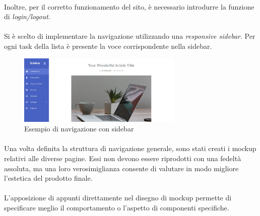 \documentclass[12pt,a4paper,twoside,english,italian]{book}
\begin{document}
\paragraph{} Inoltre, per il corretto funzionamento del sito, è necessario introdurre la funzione di \emph{login/logout}.

\paragraph{} Si è scelto di implementare la navigazione utilizzando una \emph{responsive sidebar}. Per ogni task della lista è presente la voce corrispondente nella sidebar. 

\newpage

\begin{figure}[H]
    \centering
    \includegraphics[width=0.7\textwidth]{img/bootstrap-sidebar.jpg}
    \caption{Esempio di navigazione con sidebar}
\end{figure}

\paragraph{} Una volta definita la struttura di navigazione generale, sono stati creati i mockup relativi alle diverse pagine. Essi non devono essere riprodotti con una fedeltà assoluta, ma una loro verosimiglianza consente di valutare in modo migliore l'estetica del prodotto finale. 

\paragraph{} L'apposizione di appunti direttamente nel disegno di mockup permette di specificare meglio il comportamento o l'aspetto di componenti specifiche. 
\end{document}
